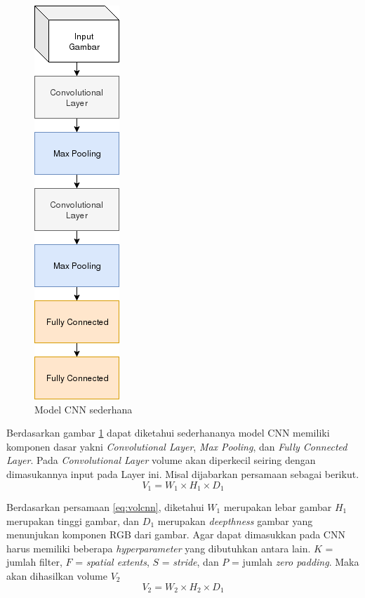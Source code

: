 \documentclass[./skripsi.tex]{subfiles}
\begin{document}
\begin{figure}[H]
    \centering
    \includegraphics[width=0.2\linewidth]{public/assets/img/SimpleCNN.png}
    \caption{Model CNN sederhana}
    \label{fig:modelcnnsederhana}
\end{figure}
\par Berdasarkan gambar \ref{fig:modelcnnsederhana} dapat diketahui sederhananya model CNN memiliki komponen dasar yakni \textit{Convolutional Layer}, \textit{Max Pooling}, dan \textit{Fully Connected Layer}. Pada \textit{Convolutional Layer} volume akan diperkecil seiring dengan dimasukannya input pada Layer ini. Misal dijabarkan persamaan sebagai berikut.
\begin{equation}
    V_1 = W_1 \times H_1 \times D_1
    \label{eq:volcnn}
\end{equation}
\par Berdasarkan persamaan \ref{eq:volcnn}, diketahui $W_1$ merupakan lebar gambar $H_1$ merupakan tinggi gambar, dan $D_1$ merupakan \textit{deepthness} gambar yang menunjukan komponen RGB dari gambar. Agar dapat dimasukkan pada CNN harus memiliki beberapa \textit{hyperparameter} yang dibutuhkan antara lain. $K$ = jumlah filter, $F$ = \textit{spatial extents}, $S$ = \textit{stride}, dan $P$ = jumlah \textit{zero padding}. Maka akan dihasilkan volume $V_2$
\begin{equation}
    V_2 = W_2 \times H_2 \times D_1
    \label{eq:volcnn2}
\end{equation}
\end{document}
